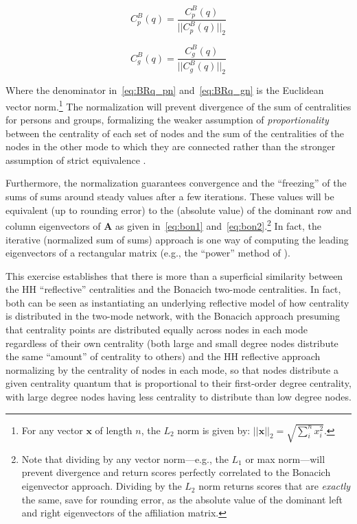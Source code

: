 \documentclass[a4paper,fleqn]{cas-sc}
\begin{document}
\begin{equation}
   C^B_p(q) = \frac{C^B_p(q)}{||C^B_p(q)||_2}
   \label{eq:BRq_pn}
\end{equation} 

\begin{equation}
   C^B_g(q) = \frac{C^B_g(q)}{||C^B_g(q)||_2}
   \label{eq:BRq_gn}
\end{equation} 

Where the denominator in~\ref{eq:BRq_pn} and~\ref{eq:BRq_gn} is the Euclidean vector norm.\footnote{For any vector $\mathbf{x}$ of length $n$, the $L_2$ norm is given by: $||\mathbf{x}||_2 = \sqrt{\sum_i^n x_i^2}$.} The normalization will prevent divergence of the sum of centralities for persons and groups, formalizing the weaker assumption of \textit{proportionality} between the centrality of each set of nodes and the sum of the centralities of the nodes in the other mode to which they are connected rather than the stronger assumption of strict equivalence \citep{bonacich_lloyd01}. 

Furthermore, the normalization guarantees convergence and the ``freezing'' of the sums of sums around steady values after a few iterations. These values will be equivalent (up to rounding error) to the (absolute value) of the dominant row and column eigenvectors of $\mathbf{A}$ as given in~\ref{eq:bon1} and~\ref{eq:bon2}.\footnote{Note that dividing by any vector norm---e.g., the $L_1$ or max norm---will prevent divergence and return scores perfectly correlated to the Bonacich eigenvector approach. Dividing by the $L_2$ norm returns scores that are \textit{exactly} the same, save for rounding error, as the absolute value of the dominant left and right eigenvectors of the affiliation matrix.} In fact, the iterative (normalized sum of sums) approach is one way of computing the leading eigenvectors of a rectangular matrix (e.g., the ``power'' method of \citet{mises1929praktische}). 

This exercise establishes that there is more than a superficial similarity between the HH ``reflective'' centralities and the Bonacich two-mode centralities. In fact, both can be seen as instantiating an underlying reflective model of how centrality is distributed in the two-mode network, with the Bonacich approach presuming that centrality points are distributed equally across nodes in each mode regardless of their own centrality (both large and small degree nodes distribute the same ``amount'' of centrality to others) and the HH reflective approach normalizing by the centrality of nodes in each mode, so that nodes distribute a given centrality quantum that is proportional to their first-order degree centrality, with large degree nodes having less centrality to distribute than low degree nodes. 
\end{document}

